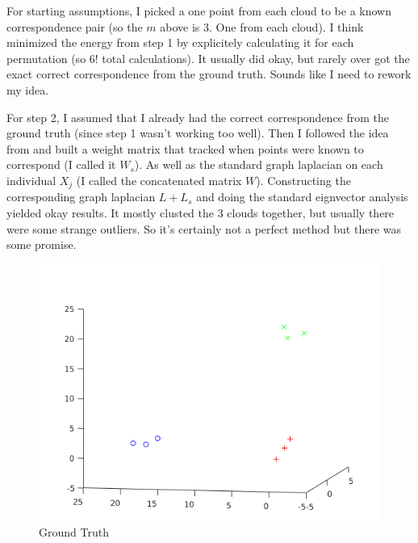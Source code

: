 For starting assumptions, I picked a one point from each cloud to be a known correspondence pair (so the $m$ above is 3. One from each cloud). I think minimized the energy from step 1 by explicitely calculating it for each permutation (so $6!$ total calculations). It usually did okay, but rarely over got the exact correct correspondence from the ground truth. Sounds like I need to rework my idea.

For step 2, I assumed that I already had the correct correspondence from the ground truth (since step 1 wasn't working too well). Then I followed the idea from \cite{Wang11} and built a weight matrix that tracked when points were known to correspond (I called it $W_s$). As well as the standard graph laplacian on each individual $X_j$ (I called the concatenated matrix $W$). Constructing the corresponding graph laplacian $L + L_s$ and doing the standard eignvector analysis yielded okay results. It mostly clusted the 3 clouds together, but usually there were some strange outliers. So it's certainly not a perfect method but there was some promise.

\begin{figure}
\includegraphics[width=\linewidth]{Ground_Truth.png}
\caption{Ground Truth}
\label{img:ground-truth}
\end{figure}

